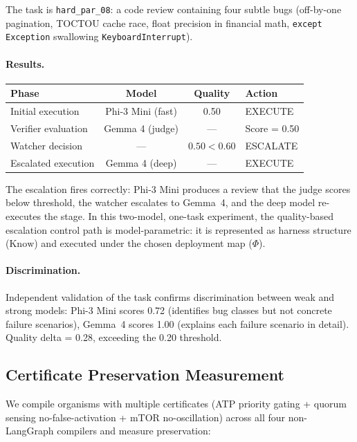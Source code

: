 The task is \texttt{hard\_par\_08}: a code review containing four subtle bugs (off-by-one pagination, TOCTOU cache race, float precision in financial math, \texttt{except Exception} swallowing \texttt{KeyboardInterrupt}).

\paragraph{Results.}

\begin{center}
\small
\begin{tabular}{@{}lccl@{}}
\toprule
\textbf{Phase} & \textbf{Model} & \textbf{Quality} & \textbf{Action} \\
\midrule
Initial execution & Phi-3 Mini (fast) & 0.50 & EXECUTE \\
Verifier evaluation & Gemma 4 (judge) & --- & Score = 0.50 \\
Watcher decision & --- & $0.50 < 0.60$ & ESCALATE \\
Escalated execution & Gemma 4 (deep) & --- & EXECUTE \\
\bottomrule
\end{tabular}
\end{center}

The escalation fires correctly: Phi-3 Mini produces a review that the judge scores below threshold, the watcher escalates to Gemma~4, and the deep model re-executes the stage. In this two-model, one-task experiment, the quality-based escalation control path is model-parametric: it is represented as harness structure ($\mathrm{Know}$) and executed under the chosen deployment map ($\Phi$).

\paragraph{Discrimination.} Independent validation of the task confirms discrimination between weak and strong models: Phi-3 Mini scores 0.72 (identifies bug classes but not concrete failure scenarios), Gemma~4 scores 1.00 (explains each failure scenario in detail). Quality delta = 0.28, exceeding the 0.20 threshold.

\subsection{Certificate Preservation Measurement}

We compile organisms with multiple certificates (ATP priority gating + quorum sensing no-false-activation + mTOR no-oscillation) across all four non-LangGraph compilers and measure preservation:

